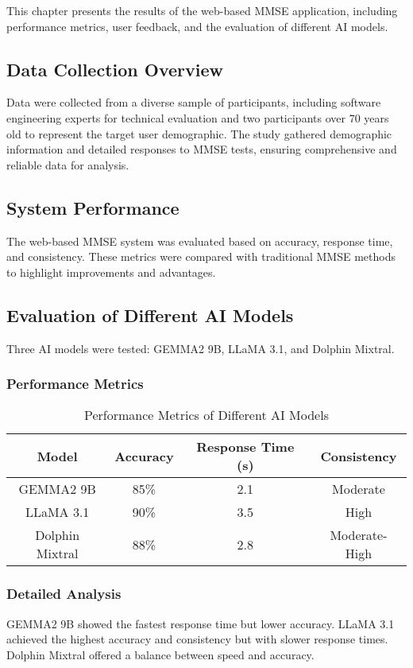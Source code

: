 This chapter presents the results of the web-based MMSE application, including performance metrics, user feedback, and the evaluation of different AI models.

\subsection{Data Collection Overview}
Data were collected from a diverse sample of participants, including software engineering experts for technical evaluation and two participants over 70 years old to represent the target user demographic. The study gathered demographic information and detailed responses to MMSE tests, ensuring comprehensive and reliable data for analysis.

\subsection{System Performance}
The web-based MMSE system was evaluated based on accuracy, response time, and consistency. These metrics were compared with traditional MMSE methods to highlight improvements and advantages.

\subsection{Evaluation of Different AI Models}
Three AI models were tested: GEMMA2 9B, LLaMA 3.1, and Dolphin Mixtral.

\subsubsection{Performance Metrics}
\begin{table}[h]
\centering
\begin{tabular}{|c|c|c|c|}
\hline
\textbf{Model} & \textbf{Accuracy} & \textbf{Response Time (s)} & \textbf{Consistency} \\
\hline
GEMMA2 9B & 85\% & 2.1 & Moderate \\
LLaMA 3.1 & 90\% & 3.5 & High \\
Dolphin Mixtral & 88\% & 2.8 & Moderate-High \\
\hline
\end{tabular}
\caption{Performance Metrics of Different AI Models}
\label{tab:model_comparison}
\end{table}

\subsubsection{Detailed Analysis}
GEMMA2 9B showed the fastest response time but lower accuracy. LLaMA 3.1 achieved the highest accuracy and consistency but with slower response times. Dolphin Mixtral offered a balance between speed and accuracy.

